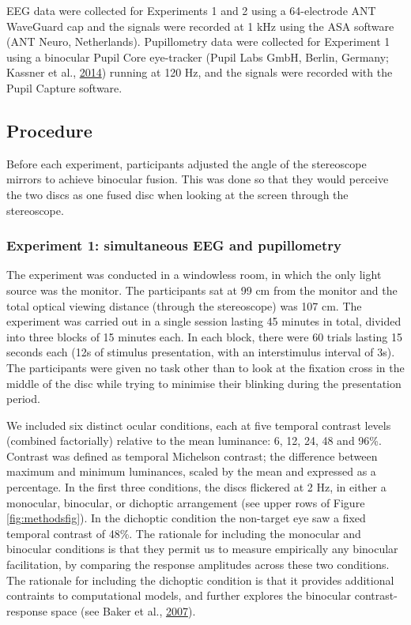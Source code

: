 \documentclass[
]{article}
\begin{document}
EEG data were collected for Experiments 1 and 2 using a 64-electrode ANT WaveGuard cap and the signals were recorded at 1 kHz using the ASA software (ANT Neuro, Netherlands). Pupillometry data were collected for Experiment 1 using a binocular Pupil Core eye-tracker (Pupil Labs GmbH, Berlin, Germany; Kassner et al., \protect\hyperlink{ref-Kassner2014}{2014}) running at 120 Hz, and the signals were recorded with the Pupil Capture software.

\hypertarget{procedure}{%
\subsection{Procedure}\label{procedure}}

Before each experiment, participants adjusted the angle of the stereoscope mirrors to achieve binocular fusion. This was done so that they would perceive the two discs as one fused disc when looking at the screen through the stereoscope.

\hypertarget{experiment-1-simultaneous-eeg-and-pupillometry}{%
\subsubsection{Experiment 1: simultaneous EEG and pupillometry}\label{experiment-1-simultaneous-eeg-and-pupillometry}}

The experiment was conducted in a windowless room, in which the only light source was the monitor. The participants sat at 99 cm from the monitor and the total optical viewing distance (through the stereoscope) was 107 cm. The experiment was carried out in a single session lasting 45 minutes in total, divided into three blocks of 15 minutes each. In each block, there were 60 trials lasting 15 seconds each (12s of stimulus presentation, with an interstimulus interval of 3s). The participants were given no task other than to look at the fixation cross in the middle of the disc while trying to minimise their blinking during the presentation period.

We included six distinct ocular conditions, each at five temporal contrast levels (combined factorially) relative to the mean luminance: 6, 12, 24, 48 and 96\%. Contrast was defined as temporal Michelson contrast; the difference between maximum and minimum luminances, scaled by the mean and expressed as a percentage. In the first three conditions, the discs flickered at 2 Hz, in either a monocular, binocular, or dichoptic arrangement (see upper rows of Figure \ref{fig:methodsfig}). In the dichoptic condition the non-target eye saw a fixed temporal contrast of 48\%. The rationale for including the monocular and binocular conditions is that they permit us to measure empirically any binocular facilitation, by comparing the response amplitudes across these two conditions. The rationale for including the dichoptic condition is that it provides additional contraints to computational models, and further explores the binocular contrast-response space (see Baker et al., \protect\hyperlink{ref-Baker2007}{2007}).
\end{document}
